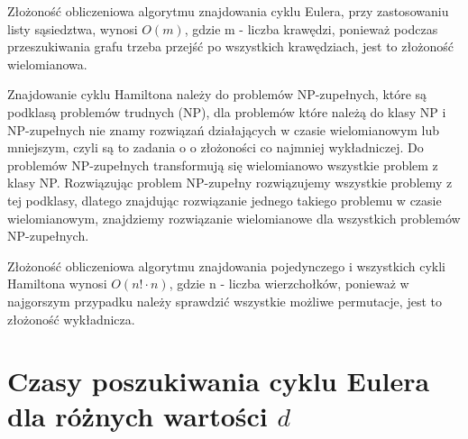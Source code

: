 \documentclass[polish,polish,a4paper]{article}
\begin{document}
\begin{spacing}{1.25}
	Złożoność obliczeniowa algorytmu znajdowania cyklu Eulera, przy zastosowaniu listy sąsiedztwa, wynosi $O(m)$, gdzie m - liczba krawędzi, ponieważ podczas przeszukiwania grafu trzeba przejść po wszystkich krawędziach, jest to złożoność wielomianowa.
	
	Znajdowanie cyklu Hamiltona należy do problemów NP-zupełnych, które są podklasą problemów trudnych (NP), dla problemów które należą do klasy NP i NP-zupełnych nie znamy rozwiązań działających w czasie wielomianowym lub mniejszym, czyli są to zadania o o złożoności co najmniej wykładniczej. Do problemów NP-zupełnych transformują się wielomianowo wszystkie problem z klasy NP. Rozwiązując problem NP-zupełny rozwiązujemy wszystkie problemy z tej podklasy, dlatego znajdując rozwiązanie jednego takiego problemu w czasie wielomianowym, znajdziemy rozwiązanie wielomianowe dla wszystkich problemów NP-zupełnych.
	

	
	Złożoność obliczeniowa algorytmu znajdowania pojedynczego i wszystkich cykli Hamiltona wynosi $O(n! \cdot n)$, gdzie n - liczba wierzchołków, ponieważ w najgorszym przypadku należy sprawdzić wszystkie możliwe permutacje, jest to złożoność wykładnicza.
	

	
\section{Czasy poszukiwania cyklu Eulera dla różnych wartości $d$}


\begin{spacing}{1.3}
	{
		\centering
}
\end{spacing}
\end{spacing}
\end{document}
